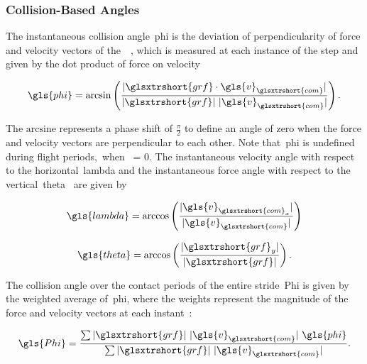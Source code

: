             \subsubsection{Collision-Based Angles}
            
            The instantaneous collision angle~\gls{phi} is the deviation of perpendicularity of force and velocity vectors of the~~\cite{Lee2011}, which is measured at each instance of the step and given by the dot product of force on velocity
            
            \begin{align}
                \gls{phi} = \textrm{arcsin}\left(\frac{\vert\glsxtrshort{grf} \cdot \gls{v}_{\glsxtrshort{com}}\vert}{\vert\glsxtrshort{grf}\vert~\vert\gls{v}_{\glsxtrshort{com}}\vert}\right).
                \label{eq:phi}
            \end{align}

            The $\textrm{arcsine}$ represents a phase shift of $\frac{\pi}{2}$ to define an angle of zero when the force and velocity vectors are perpendicular to each other. Note that~\gls{phi} is undefined during flight periods,~\ie when~ = 0. The instantaneous velocity angle with respect to the horizontal~\gls{lambda} and the instantaneous force angle with respect to the vertical~\gls{theta}~\cite{Lee2011} are given by

            \begin{align}
                \gls{lambda} = \textrm{arccos}\left(\frac{\vert\gls{v}_{\glsxtrshort{com}_x}\vert}{\vert\gls{v}_{\glsxtrshort{com}}\vert}\right)
                \label{eq:lambda}
            \end{align}

            \begin{align}
                \gls{theta} = \textrm{arccos}\left(\frac{\vert\glsxtrshort{grf}_y\vert}{\vert\glsxtrshort{grf}\vert}\right).
                \label{eq:theta}
            \end{align}
            
            The collision angle over the contact periods of the entire stride~\gls{Phi} is given by the weighted average of~\gls{phi}, where the weights represent the magnitude of the force and velocity vectors at each instant~\cite{Lee2011}:
            
            \begin{align}
                \gls{Phi} = \frac{\sum\vert\glsxtrshort{grf}\vert~\vert\gls{v}_{\glsxtrshort{com}}\vert~\gls{phi}}{\sum\vert\glsxtrshort{grf}\vert~\vert\gls{v}_{\glsxtrshort{com}}\vert}.
                \label{eq:Phi}
            \end{align}

